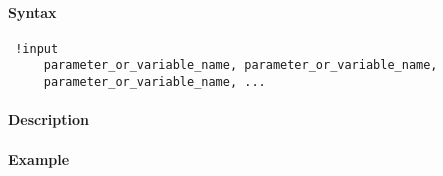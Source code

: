 


	\paragraph{Syntax}
 
 \begin{verbatim}
 !input
     parameter_or_variable_name, parameter_or_variable_name,
     parameter_or_variable_name, ...
 \end{verbatim}
 
 \paragraph{Description}
 
 \paragraph{Example}



